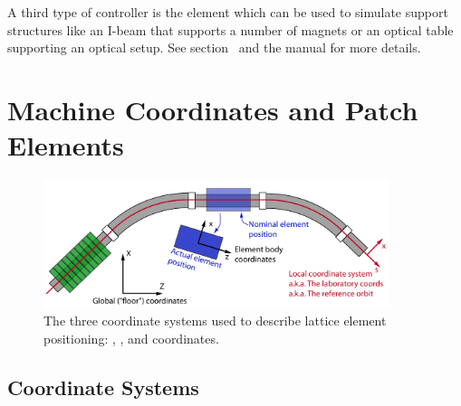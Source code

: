 \documentclass{hitec}
\newcommand{\Section}[1]{\section{#1}\vspace*{-1ex}}
\begin{document}
A third type of controller is the  element which can be used to simulate support
structures like an I-beam that supports a number of magnets or an optical table supporting an
optical setup. See section~ and the \bmad manual for more details.

\newpage

\Section{Machine Coordinates and Patch Elements}


\begin{figure}[tb]
  \centering
  \includegraphics[width=0.9\textwidth]{coordinates.pdf}
  \caption{The three coordinate systems used to describe lattice element positioning:
, , and  coordinates.}
  \label{f:coordinates}
\end{figure}

\subsection{Coordinate Systems}
\end{document}
